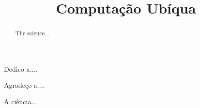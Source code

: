 \documentclass[bacharelado]{unb-cic}
\title{Computação Ubíqua}
\begin{document}
\maketitle

\pretextual
\begin{dedicatoria}
	Dedico a....
\end{dedicatoria}

\begin{agradecimentos}
	Agradeço a....
\end{agradecimentos}

\begin{resumo}
	A ciência...
\end{resumo}


\begin{abstract}
	The science...
\end{abstract}

\tableofcontents
\listoffigures
\listoftables

\textual




\postextual




\end{document}
